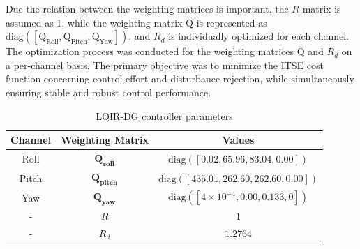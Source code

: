 \documentclass[3p]{elsarticle}
\begin{document}
Due the relation between the weighting matrices is important, the $R$ matrix is assumed as 1, while the weighting matrix $\boldsymbol{\mathrm{Q}}$ is represented as $\text{diag}([\boldsymbol{\mathrm{Q}}_{\text{Roll}}, \boldsymbol{\mathrm{Q}}_{\text{Pitch}}, \boldsymbol{\mathrm{Q}}_{\text{Yaw}}])$, and $R_d$ is individually optimized for each channel. The optimization process was conducted for the weighting matrices $\boldsymbol{\mathrm{Q}}$ and $R_d$ on a per-channel basis. The primary objective was to minimize the ITSE cost function concerning control effort and disturbance rejection, while simultaneously ensuring stable and robust control performance.
\begin{table}[H]
    \centering
    \caption{LQIR-DG controller parameters}
    \renewcommand{\arraystretch}{1.3}
    \begin{tabular}{@{}ccc@{}}
    \toprule
    Channel & Weighting Matrix & Values \\
    \midrule
    Roll & $\mathbf{Q_{roll}}$ & $\text{diag}([0.02, 65.96, 83.04, 0.00])$ \\
    Pitch & $\mathbf{Q_{pitch}}$ & $\text{diag}([435.01, 262.60, 262.60, 0.00])$ \\
    Yaw & $\mathbf{Q_{yaw}}$ & $\text{diag}([4 \times 10^{-4}, 0.00, 0.133, 0])$ \\
    -& $R$ & $1$ \\
    -&$R_d$ & $1.2764$ \\
    \bottomrule
    \end{tabular}
    \label{tab:control weight_new} %
\end{table}
\end{document}
